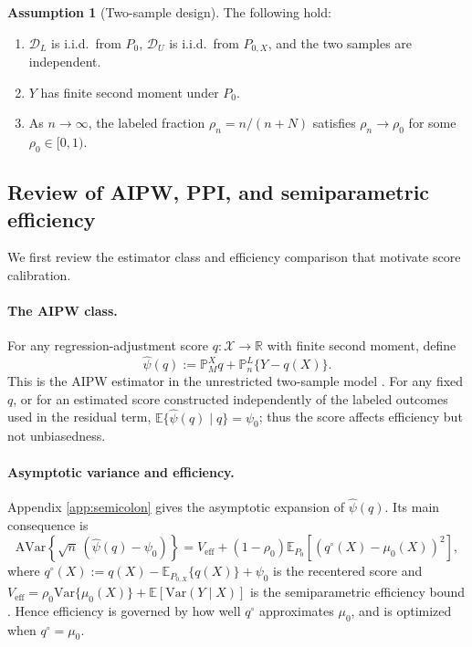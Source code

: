 \documentclass{article}
\theoremstyle{plain}
\theoremstyle{definition}
\newtheorem{assumption}{Assumption}
\newcommand{\E}{\mathbb{E}}
\newcommand{\Var}{\mathrm{Var}}
\newcommand{\R}{\mathbb{R}}
\newcommand{\1}{\mathbf{1}}
\newcommand{\rhozero}{\rho_0}
\newcommand{\rhon}{\rho_n}
\newcommand{\Pl}{\mathbb{P}^{L}_n}
\newcommand{\Pmx}{\mathbb{P}^{X}_M}
\newcommand{\Px}{P_{0,X}}
\begin{document}
\begin{assumption}[Two-sample design]
\label{assump:design}
The following hold:
\begin{enumerate}[leftmargin=6mm,label=(\roman*)]
\item \(\mathcal D_L\) is i.i.d.\ from \(P_0\), \(\mathcal D_U\) is i.i.d.\ from \(\Px\), and the two samples are independent.
\item \(Y\) has finite second moment under \(P_0\).
\item As \(n\to\infty\), the labeled fraction \(\rhon=n/(n+N)\) satisfies
\(\rhon\to\rhozero\) for some \(\rhozero\in[0,1)\).
\end{enumerate}
\end{assumption}

\subsection{Review of AIPW, PPI, and semiparametric efficiency}

We first review the estimator class and efficiency comparison that motivate
score calibration.

\paragraph{The AIPW class.}
For any regression-adjustment score \(q:\mathcal X\to\R\) with finite second
moment, define
\begin{equation}
\label{eq:aipw-family-main}
\widehat\psi(q)
:=
\Pmx q+\Pl\{Y-q(X)\}.
\end{equation}
This is the AIPW estimator in the unrestricted two-sample model
\citep{robins1994estimation}. For any fixed \(q\), or for an estimated score
constructed independently of the labeled outcomes used in the residual term,
\(\E\{\widehat\psi(q)\mid q\}=\psi_0\); thus the score affects efficiency but
not unbiasedness.

\paragraph{Asymptotic variance and efficiency.}
Appendix \ref{app:semicolon} gives the asymptotic expansion of $\widehat\psi(q)$. Its main
consequence is
\[
\mathrm{AVar}\!\left\{\sqrt n\,(\widehat\psi(q)-\psi_0)\right\}
=
V_{\mathrm{eff}}
+
(1-\rho_0)
\E_{P_0}\!\left[(q^\circ(X)-\mu_0(X))^2\right],
\]
where
\(q^\circ(X):=q(X)-\E_{\Px}\{q(X)\}+\psi_0\) is the recentered score and
\(V_{\mathrm{eff}}=\rhozero\Var\{\mu_0(X)\}+\E[\Var(Y\mid X)]\) is the semiparametric efficiency bound
\citep{bickel1993efficient}. Hence efficiency is governed by how well
\(q^\circ\) approximates \(\mu_0\), and is optimized when
\(q^\circ=\mu_0\).
\end{document}
